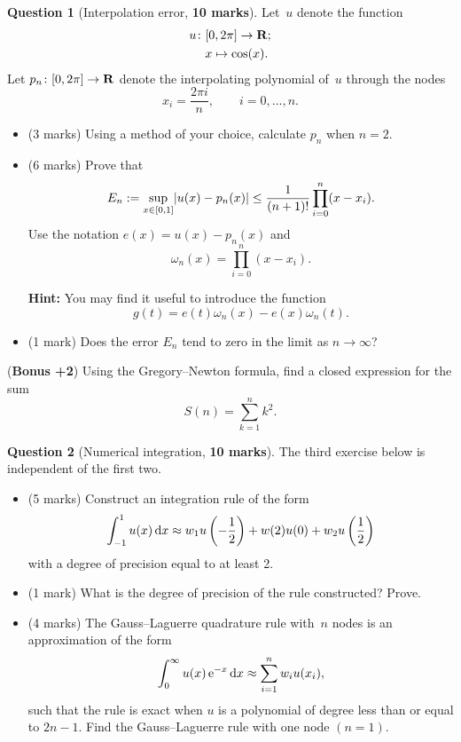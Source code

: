\documentclass[11pt]{article}
\theoremstyle{definition}
\newtheorem{question}{Question}
\begin{document}
\newpage
\begin{question}
    [Interpolation error, \textbf{10 marks}]
    Let~$u$ denote the function
    \begin{align*}
        u\colon
        &[0, 2\pi] \to \mathbf R; \\
        &x \mapsto \cos(x).
    \end{align*}
    Let $p_n \colon [0, 2 \pi] \to \mathbf R$ denote the interpolating polynomial of~$u$ through the nodes
    \[
        x_i = \frac{2 \pi i}{n}, \qquad i = 0, \dotsc, n.
    \]
    \begin{itemize}
        \item
            (3 marks)
            Using a method of your choice,
            calculate $p_n$ when $n = 2$.

        \item
            (6 marks)
            Prove that
            \[
                E_n := \sup_{x \in [0, 1]} \lvert u(x) - p_n(x)\rvert
                \leq \frac{1}{(n+1)!} \prod_{i=0}^{n} (x - x_i).
            \]
            Use the notation $e(x) = u(x) - p_n(x)$ and
            \[
                \omega_n(x) = \prod_{i=0}^{n} (x - x_i).
            \]

            \textbf{Hint:} You may find it useful to introduce the function
            \[
                g(t) = e(t) \omega_n(x) - e(x) \omega_n(t).
            \]
        \item (1 mark) Does the error $E_n$ tend to zero in the limit as $n \to \infty$?
    \end{itemize}

    \noindent (\textbf{Bonus +2}) Using the Gregory--Newton formula,
    find a closed expression for the sum
    \[
        S(n) = \sum_{k=1}^{n} k^2.
    \]
\end{question}

\newpage
\begin{question}
    [Numerical integration, \textbf{10 marks}]
    The third exercise below is independent of the first two.
    \begin{itemize}
        \item (5 marks)
            Construct an integration rule of the form
            \[
                \int_{-1}^{1} u(x) \, \mathrm d x \approx w_1 u\left(-\frac{1}{2} \right) + w(2) u(0) +  w_2 u\left(\frac{1}{2} \right)
            \]
            with a degree of precision equal to at least 2.

        \item
            (1 mark)
            What is the degree of precision of the rule constructed?
            Prove.

        \item (4 marks)
            The Gauss--Laguerre quadrature rule with~$n$ nodes is an approximation of the form
            \[
                \int_{0}^{\infty} u(x) \, \mathrm e^{-x} \, \mathrm d x \approx \sum_{i=1}^{n} w_i u(x_i),
            \]
            such that the rule is exact when $u$ is a polynomial of degree less than or equal to $2n-1$.
            Find the Gauss--Laguerre rule with one node $(n = 1)$.
    \end{itemize}
\end{question}
\end{document}

